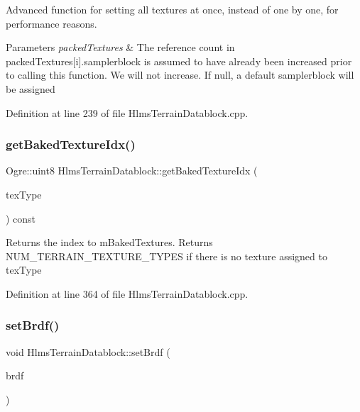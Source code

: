 Advanced function for setting all textures at once, instead of one by one, for performance reasons. 
\begin{DoxyParams}{Parameters}
{\em packed\+Textures} & The reference count in packed\+Textures\mbox{[}i\mbox{]}.samplerblock is assumed to have already been increased prior to calling this function. We will not increase. If null, a default samplerblock will be assigned \\
\hline
\end{DoxyParams}


Definition at line 239 of file Hlms\+Terrain\+Datablock.\+cpp.

\mbox{\label{class_hlms_terrain_datablock_a08b7b8e53cd57ca6729929602d24411a}} 
\subsubsection{\texorpdfstring{get\+Baked\+Texture\+Idx()}{getBakedTextureIdx()}}
{\footnotesize\ttfamily Ogre\+::uint8 Hlms\+Terrain\+Datablock\+::get\+Baked\+Texture\+Idx (\begin{DoxyParamCaption}\item[{Terrain\+Texture\+Types}]{tex\+Type }\end{DoxyParamCaption}) const}

Returns the index to m\+Baked\+Textures. Returns N\+U\+M\+\_\+\+T\+E\+R\+R\+A\+I\+N\+\_\+\+T\+E\+X\+T\+U\+R\+E\+\_\+\+T\+Y\+P\+ES if there is no texture assigned to tex\+Type 

Definition at line 364 of file Hlms\+Terrain\+Datablock.\+cpp.

\mbox{\label{class_hlms_terrain_datablock_ab4d3d4b79e5fa6340579ad40f8be945f}} 
\subsubsection{\texorpdfstring{set\+Brdf()}{setBrdf()}}
{\footnotesize\ttfamily void Hlms\+Terrain\+Datablock\+::set\+Brdf (\begin{DoxyParamCaption}\item[{Terrain\+Brdf\+::\+Terrain\+Brdf}]{brdf }\end{DoxyParamCaption})}

